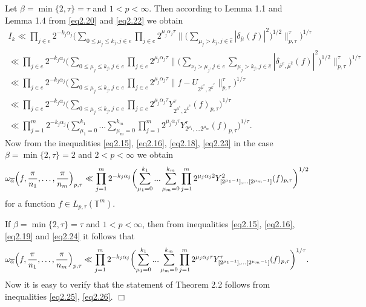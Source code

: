 \documentclass[12pt]{article}
\theoremstyle{plain}
\begin{document}
Let $\beta = \min\{2, \tau\}=\tau$ and $1< p< \infty$. Then according to Lemma 1.1 and Lemma 1.4 \cite{4} from \eqref{eq2.20} and \eqref{eq2.22} we obtain
\begin{multline}\label{eq2.24}
I_{\overline{k}}\ll \prod_{j\in e}2^{-k_{j}\alpha_{j}}\biggl(\sum\limits_{0\leqslant \mu_{j}\leqslant k_{j}, j\in e}\prod_{j\in e}2^{\mu_{j}\alpha_{j}\tau} \biggl\|\biggl(\sum\limits_{\mu_{j}>k_{j}, j\in \hat{e}} |\delta_{\overline{\mu}}(f)|^{2}\biggr)^{1/2}\biggr\|_{p, \tau}^{\tau}\biggr)^{1/\tau}
\\
\ll \prod_{j\in e}2^{-k_{j}\alpha_{j}}\biggl(\sum\limits_{0\leqslant \mu_{j}\leqslant k_{j}, j\in e}\prod_{j\in e}2^{\mu_{j}\alpha_{j}\tau} \biggl\|\biggl(\sum\limits_{\nu_{j}>\mu_{j}, j\in e}\sum\limits_{\mu_{j}>k_{j}, j\in \hat{e}} |\delta_{\overline{\nu}^{e}, \overline{\mu}^{\hat{e}}}(f)|^{2}\biggr)^{1/2}\biggr\|_{p, \tau}^{\tau}\biggr)^{1/\tau}
\\
\ll \prod_{j\in e}2^{-k_{j}\alpha_{j}}\biggl(\sum\limits_{0\leqslant \mu_{j}\leqslant k_{j}, j\in e}\prod_{j\in e}2^{\mu_{j}\alpha_{j}\tau} \|f-U_{2^{\overline{\mu}^{e}}, 2^{\overline{k}^{\hat{e}}}}\|_{p, \tau}^{\tau} \biggr)^{1/\tau} 
\\
\ll \prod_{j\in e}2^{-k_{j}\alpha_{j}}\biggl(\sum\limits_{0\leqslant \mu_{j}\leqslant k_{j}, j\in e}\prod_{j\in e}2^{\mu_{j}\alpha_{j}\tau} Y_{2^{\overline{\mu}^{e}}, 2^{\overline{k}^{\hat{e}}}}^{\tau}(f)_{p, \tau} \biggr)^{1/\tau} 
\\
\ll \prod_{j=1}^{m}2^{-k_{j}\alpha_{j}}\biggl(\sum\limits_{\mu_{1}=0}^{k_{1}}...\sum\limits_{\mu_{m}=0}^{k_{m}}\prod_{j=1}^{m}2^{\mu_{j}\alpha_{j}\tau} Y_{2^{\mu_{1}},... 2^{\mu_{m}}}^{\tau}(f)_{p, \tau} \biggr)^{1/\tau}.
\end{multline} 
Now from the inequalities \eqref{eq2.15}, \eqref{eq2.16}, \eqref{eq2.18}, \eqref{eq2.23} in the case $\beta = \min\{2, \tau\}=2$ and $2< p< \infty$ we obtain
\begin{equation}\label{eq2.25}
\omega_{\overline\alpha}\Bigl(f,\frac{\pi}{n_{1}},\ldots, \frac{\pi}{n_{m}}\Bigr)_{p, \tau}  \ll
\prod_{j=1}^{m}2^{-k_{j}\alpha_{j}}\biggl(\sum\limits_{\mu_{1}=0}^{k_{1}}...\sum\limits_{\mu_{m}=0}^{k_{m}}\prod_{j=1}^{m}2^{\mu_{j}\alpha_{j}2} Y_{[2^{\mu_{1}-1}],... [2^{\mu_{m}-1}]}^{2}(f)_{p, \tau} \biggr)^{1/2}
\end{equation}
for a function  $f\in L_{p, \tau}(\mathbb{T}^{m})$.

If $\beta = \min\{2, \tau\}=\tau$ and $1< p< \infty$, then from inequalities \eqref{eq2.15}, \eqref{eq2.16}, \eqref{eq2.19} and \eqref{eq2.24} it follows that
\begin{equation}\label{eq2.26} 
\omega_{\overline\alpha}\Bigl(f,\frac{\pi}{n_{1}},\ldots, \frac{\pi}{n_{m}}\Bigr)_{p, \tau}  \ll
\prod_{j=1}^{m}2^{-k_{j}\alpha_{j}}\biggl(\sum\limits_{\mu_{1}=0}^{k_{1}}...\sum\limits_{\mu_{m}=0}^{k_{m}}\prod_{j=1}^{m}2^{\mu_{j}\alpha_{j}\tau} Y_{[2^{\mu_{1}-1}],... [2^{\mu_{m}-1}]}^{\tau}(f)_{p, \tau} \biggr)^{1/\tau}.
\end{equation}
Now it is easy to verify that the statement of Theorem 2.2 follows from inequalities \eqref{eq2.25}, \eqref{eq2.26}.
\hfill $\Box$ 
 
\end{document}
